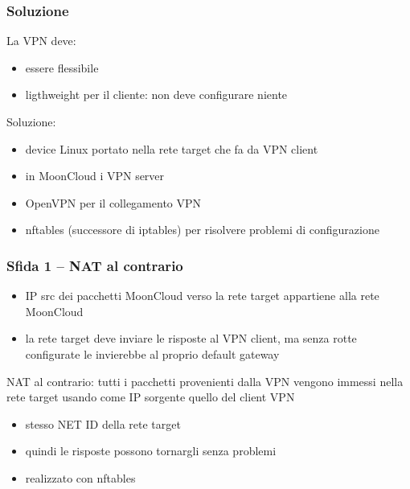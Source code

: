 \begin{frame}
    \frametitle{Soluzione}
    La VPN deve:
    \begin{itemize}
        \item essere \alert{flessibile}
        \item \alert{ligthweight} per il cliente: non deve configurare niente
    \end{itemize}

    Soluzione:
    \begin{itemize}
        \item device \alert{Linux} portato nella rete target che fa da VPN client
        \item in MoonCloud i \alert{VPN server}
        \item \alert{OpenVPN} per il collegamento VPN 
        \item \alert{nftables} (successore
        di \alert{iptables}) per risolvere problemi di configurazione
    \end{itemize}
\end{frame}


\begin{frame}
    \frametitle{Sfida 1 -- NAT al contrario}

    \begin{itemize}
        \item IP src dei pacchetti MoonCloud verso la rete target
        appartiene alla rete MoonCloud
        \item la rete target deve inviare le risposte al VPN client, ma senza
        rotte configurate le invierebbe al proprio default gateway
    \end{itemize}

    \alert{NAT al contrario}: tutti i pacchetti provenienti dalla VPN vengono
    immessi nella rete target usando come IP sorgente quello del client VPN
    \begin{itemize}
        \item stesso NET ID della rete target
        \item quindi le risposte possono tornargli senza problemi
        \item realizzato con \alert{nftables}
    \end{itemize}
\end{frame}

